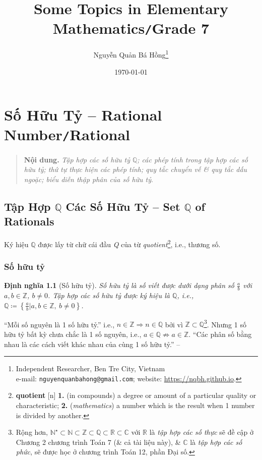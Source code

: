 \documentclass[oneside]{book}
\title{Some Topics in Elementary Mathematics\texttt{/}Grade 7}
\author{Nguyễn Quản Bá Hồng\footnote{Independent Researcher, Ben Tre City, Vietnam\\e-mail: \texttt{nguyenquanbahong@gmail.com}; website: \url{https://nqbh.github.io}.}}
\date{\today}
\numberwithin{equation}{section}
\newtheorem{dinhnghia}{Định nghĩa}[section]
\begin{document}
\maketitle
\setcounter{secnumdepth}{4}
\setcounter{tocdepth}{3}
\tableofcontents
\newpage


\chapter{Số Hữu Tỷ -- Rational Number\texttt{/}Rational}

\begin{quotation}
	\textbf{Nội dung.} \textit{Tập hợp các số hữu tỷ $\mathbb{Q}$; các phép tính trong tập hợp các số hữu tỷ; thứ tự thực hiện các phép tính; quy tắc chuyển vế \& quy tắc dấu ngoặc; biểu diễn thập phân của số hữu tỷ}.
\end{quotation}

\section{Tập Hợp $\mathbb{Q}$ Các Số Hữu Tỷ -- Set $\mathbb{Q}$ of Rationals}
Ký hiệu $\mathbb{Q}$ được lấy từ chữ cái đầu \textit{Q} của từ \textit{quotient}\footnote{\textbf{quotient} [n] \textbf{1.} (in compounds) a degree or amount of a particular quality or characteristic; \textbf{2.} (\textit{mathematics}) a number which is the result when 1 number is divided by another.}, i.e., thương số.

\subsection{Số hữu tỷ}

\begin{dinhnghia}[Số hữu tỷ]
	\emph{Số hữu tỷ} là số viết được dưới dạng phân số $\frac{a}{b}$ với $a,b\in\mathbb{Z}$, $b\ne 0$. \emph{Tập hợp các số hữu tỷ} được ký hiệu là $\mathbb{Q}$, i.e., $\mathbb{Q}\coloneqq\left\{\frac{a}{b}|a,b\in\mathbb{Z},\ b\ne 0\right\}$.
\end{dinhnghia}
``Mỗi số nguyên là 1 số hữu tỷ.'' i.e., $n\in\mathbb{Z}\Rightarrow n\in\mathbb{Q}$ bởi vì $\mathbb{Z}\subset\mathbb{Q}$\footnote{Rộng hơn, $\mathbb{N}^\star\subset\mathbb{N}\subset\mathbb{Z}\subset\mathbb{Q}\subset\mathbb{R}\subset\mathbb{C}$ với $\mathbb{R}$ là \textit{tập hợp các số thực} sẽ đề cập ở Chương 2 chương trình Toán 7 (\& cả tài liệu này), \& $\mathbb{C}$ là \textit{tập hợp các số phức}, sẽ được học ở chương trình Toán 12, phần Đại số.}. Nhưng 1 số hữu tỷ bất kỳ chưa chắc là 1 số nguyên, i.e., $a\in\mathbb{Q}\not\Rightarrow a\in\mathbb{Z}$. ``Các phân số bằng nhau là các cách viết khác nhau của cùng 1 số hữu tỷ.'' -- \cite[p. 6]{SGK_Toan_7_Canh_Dieu_tap_1}
\end{document}
